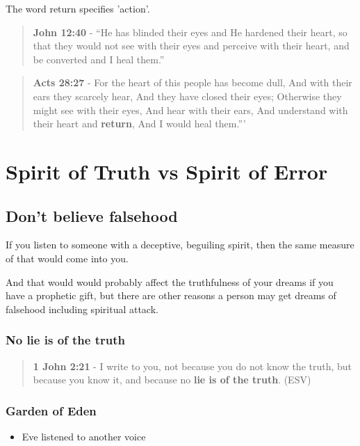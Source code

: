 \documentclass[11pt]{article}
\begin{document}
The word return specifies 'action'.

\begin{quote}
\textbf{John 12:40} - “He has blinded their eyes and He hardened their heart, so that they would not see with their eyes and perceive with their heart, and be converted and I heal them.”
\end{quote}

\begin{quote}
\textbf{Acts 28:27} - For the heart of this people has become dull, And with their ears they scarcely hear, And they have closed their eyes; Otherwise they might see with their eyes, And hear with their ears, And understand with their heart and \textbf{return}, And I would heal them.”’
\end{quote}

\section{Spirit of Truth vs Spirit of Error}
\label{sec:orgd75715f}
\subsection{Don't believe falsehood}
\label{sec:orgdf6fad2}
If you listen to someone with a deceptive, beguiling spirit, then the same measure of that would come into you.

And that would would probably affect the truthfulness of your dreams if you have a prophetic gift, but there are other reasons a person may get dreams of falsehood including spiritual attack.

\subsubsection{No lie is of the truth}
\label{sec:orga3307b9}
\begin{quote}
\textbf{1 John 2:21} -  I write to you, not because you do not know the truth, but because you know it, and because no \textbf{lie is of the truth}.  (ESV)
\end{quote}

\subsubsection{Garden of Eden}
\label{sec:org9d0d929}
\begin{itemize}
\item Eve listened to another voice
\end{itemize}
\end{document}

